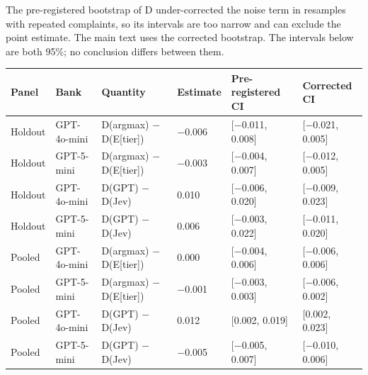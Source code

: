 The pre-registered bootstrap of D under-corrected the noise term in resamples with repeated complaints, so its intervals are too narrow and can exclude the point estimate. The main text uses the corrected bootstrap. The intervals below are both 95\%; no conclusion differs between them.

\begin{center}\small\begin{tabular}{@{}llllll@{}}\toprule
Panel & Bank & Quantity & Estimate & Pre-registered CI & Corrected CI \\
\midrule
Holdout & GPT-4o-mini & D(argmax) $-$ D(E[tier]) & $-$0.006 & [$-$0.011, 0.008] & [$-$0.021, 0.005] \\
Holdout & GPT-5-mini & D(argmax) $-$ D(E[tier]) & $-$0.003 & [$-$0.004, 0.007] & [$-$0.012, 0.005] \\
Holdout & GPT-4o-mini & D(GPT) $-$ D(Jev) & 0.010 & [$-$0.006, 0.020] & [$-$0.009, 0.023] \\
Holdout & GPT-5-mini & D(GPT) $-$ D(Jev) & 0.006 & [$-$0.003, 0.022] & [$-$0.011, 0.020] \\
Pooled & GPT-4o-mini & D(argmax) $-$ D(E[tier]) & 0.000 & [$-$0.004, 0.006] & [$-$0.006, 0.006] \\
Pooled & GPT-5-mini & D(argmax) $-$ D(E[tier]) & $-$0.001 & [$-$0.003, 0.003] & [$-$0.006, 0.002] \\
Pooled & GPT-4o-mini & D(GPT) $-$ D(Jev) & 0.012 & [0.002, 0.019] & [0.002, 0.023] \\
Pooled & GPT-5-mini & D(GPT) $-$ D(Jev) & $-$0.005 & [$-$0.005, 0.007] & [$-$0.010, 0.006] \\
\bottomrule\end{tabular}\end{center}


